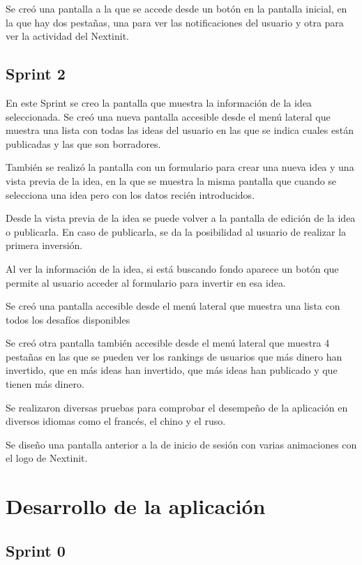 Se creó una pantalla a la que se accede desde un botón en la pantalla inicial,
en la que hay dos pestañas, una para ver las notificaciones del usuario y otra para
ver la actividad del Nextinit.


\subsection{Sprint 2}

En este Sprint se creo la pantalla que muestra la información de la idea seleccionada. Se creó 
una nueva pantalla accesible desde el menú lateral que muestra una lista con todas las ideas 
del usuario en las que se indica cuales están publicadas y las que son borradores. 

También se realizó la pantalla con un formulario para crear una nueva idea y una vista previa 
de la idea, en la que se muestra la misma pantalla que cuando se selecciona una idea pero con 
los datos recién introducidos.

Desde la vista previa de la idea se puede volver a la pantalla de edición de la idea o publicarla. En 
caso de publicarla, se da la posibilidad al usuario de realizar la primera inversión.

Al ver la información de la idea, si está buscando fondo aparece un botón que permite al usuario 
acceder al formulario para invertir en esa idea.

Se creó una pantalla accesible desde el menú lateral que muestra una lista con todos los desafíos 
disponibles

Se creó otra pantalla también accesible desde el menú lateral que muestra 4 pestañas en las que se 
pueden ver los rankings de usuarios que más dinero han invertido, que en más ideas han invertido, 
que más ideas han publicado y que tienen más dinero.

Se realizaron diversas pruebas para comprobar el desempeño de la aplicación en diversos idiomas como 
el francés, el chino y el ruso.

Se diseño una pantalla anterior a la de inicio de sesión con varias animaciones con el logo de Nextinit.

\section{Desarrollo de la aplicación}

\subsection{Sprint 0}

